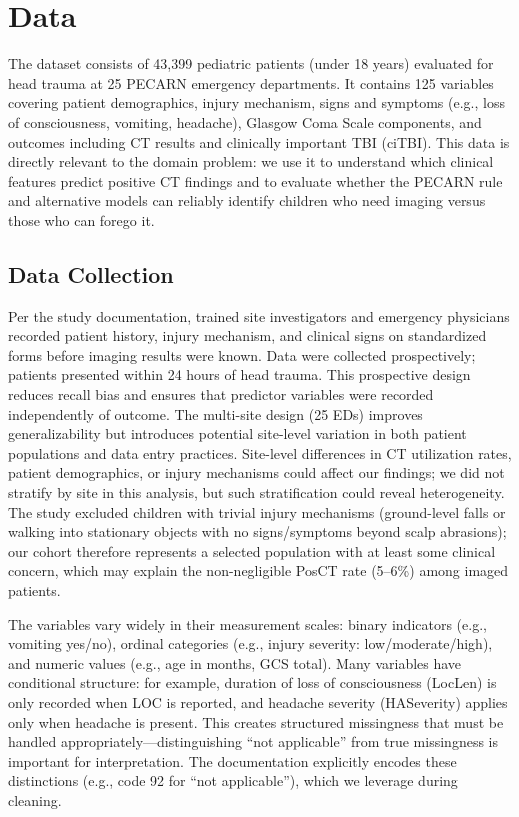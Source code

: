 \documentclass[12ptpt,letterpaper]{article}
\begin{document}
\section{Data}\label{data}

The dataset consists of 43,399 pediatric patients (under 18 years) evaluated for head trauma at 25 PECARN emergency departments. It contains 125 variables covering patient demographics, injury mechanism, signs and symptoms (e.g., loss of consciousness, vomiting, headache), Glasgow Coma Scale components, and outcomes including CT results and clinically important TBI (ciTBI). This data is directly relevant to the domain problem: we use it to understand which clinical features predict positive CT findings and to evaluate whether the PECARN rule and alternative models can reliably identify children who need imaging versus those who can forego it.

\subsection{Data Collection}\label{data-collection}

Per the study documentation, trained site investigators and emergency physicians recorded patient history, injury mechanism, and clinical signs on standardized forms before imaging results were known. Data were collected prospectively; patients presented within 24 hours of head trauma. This prospective design reduces recall bias and ensures that predictor variables were recorded independently of outcome. The multi-site design (25 EDs) improves generalizability but introduces potential site-level variation in both patient populations and data entry practices. Site-level differences in CT utilization rates, patient demographics, or injury mechanisms could affect our findings; we did not stratify by site in this analysis, but such stratification could reveal heterogeneity. The study excluded children with trivial injury mechanisms (ground-level falls or walking into stationary objects with no signs/symptoms beyond scalp abrasions); our cohort therefore represents a selected population with at least some clinical concern, which may explain the non-negligible PosCT rate (5--6\%) among imaged patients.

The variables vary widely in their measurement scales: binary indicators (e.g., vomiting yes/no), ordinal categories (e.g., injury severity: low/moderate/high), and numeric values (e.g., age in months, GCS total). Many variables have conditional structure: for example, duration of loss of consciousness (LocLen) is only recorded when LOC is reported, and headache severity (HASeverity) applies only when headache is present. This creates structured missingness that must be handled appropriately---distinguishing ``not applicable'' from true missingness is important for interpretation. The documentation explicitly encodes these distinctions (e.g., code 92 for ``not applicable''), which we leverage during cleaning.
\end{document}
